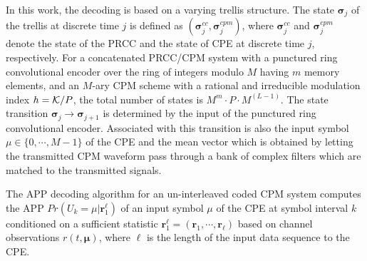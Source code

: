 \documentclass[12pt,twoside,onecolumn,a4paper,english]{IEEEtran2e}
\begin{document}
In this work, %
the decoding is based on a varying trellis structure. The state
${\boldsymbol{\sigma}}_j$ of the trellis at discrete time $j$ is
defined as
$({\boldsymbol{\sigma}}^{cc}_j,{\boldsymbol{\sigma}}^{cpm}_j)$,
where ${\boldsymbol{\sigma}}^{cc}_j$ and
${\boldsymbol{\sigma}}^{cpm}_j$ denote the state of the PRCC and
the state of CPE at discrete time $j$, respectively. For a
concatenated PRCC/CPM system with a punctured ring convolutional
encoder over the ring of integers modulo $M$ having $m$ memory
elements, and an $M$-ary CPM scheme with a rational and
irreducible modulation index $h={\cal K}/P$, the total number of
states is
$M^m{\cdot}P{\cdot}M^{(L-1)}$. %
The state transition
${\boldsymbol{\sigma}}_j\rightarrow{\boldsymbol{\sigma}}_{j+1}$ is
determined by the input of the punctured ring convolutional
encoder. Associated with this transition is also the input symbol
$\mu\in\{0,\cdots,M-1\}$ of the CPE and the mean vector which is
obtained by letting the transmitted CPM waveform pass through a
bank of complex filters which are matched to the transmitted
signals.

The APP decoding algorithm \cite{BCJR} for an un-interleaved coded CPM system %
computes the APP $Pr(U_k=\mu|\textbf{r}_1^\ell)$ of an
input symbol $\mu$ of the CPE at symbol interval $k$ conditioned
on a sufficient statistic
$\textbf{r}_1^\ell=(\textbf{r}_1,\cdots,\textbf{r}_\ell)$ based on
channel observations $r(t,\boldsymbol{\mu})$, where $\ell$ is the
length of the input data sequence to the CPE.


\end{document}
